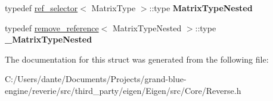 \begin{DoxyCompactItemize}
typedef \mbox{\hyperlink{struct_eigen_1_1internal_1_1ref__selector}{ref\+\_\+selector}}$<$ Matrix\+Type $>$\+::type {\bfseries Matrix\+Type\+Nested}
\item 
\mbox{\label{struct_eigen_1_1internal_1_1traits_3_01_reverse_3_01_matrix_type_00_01_direction_01_4_01_4_ac3990c23f2fc7e589f671145407b4649}} 
typedef \mbox{\hyperlink{struct_eigen_1_1internal_1_1remove__reference}{remove\+\_\+reference}}$<$ Matrix\+Type\+Nested $>$\+::type {\bfseries \+\_\+\+Matrix\+Type\+Nested}
\end{DoxyCompactItemize}


The documentation for this struct was generated from the following file\+:\begin{DoxyCompactItemize}
\item 
C\+:/\+Users/dante/\+Documents/\+Projects/grand-\/blue-\/engine/reverie/src/third\+\_\+party/eigen/\+Eigen/src/\+Core/Reverse.\+h\end{DoxyCompactItemize}
